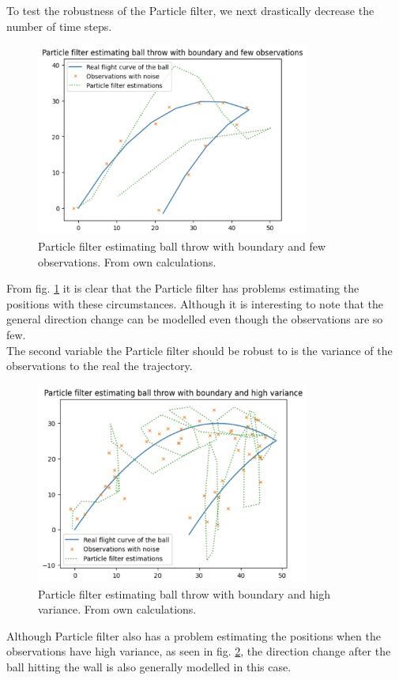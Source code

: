 \documentclass[conference]{IEEEtran}
\begin{document}
To test the robustness of the Particle filter, we next drastically decrease the number of time steps.
\begin{figure}[h]
    \centerline{\includegraphics[width=90mm]{figs/particle-filter-few-observations.png}}
    \caption{Particle filter estimating ball throw with boundary and few observations. From own calculations.}
    \label{fig:particle-filter-few-observations}
\end{figure}
From fig. \ref{fig:particle-filter-few-observations} it is clear that the Particle filter has problems estimating the positions with these circumstances.
Although it is interesting to note that the general direction change can be modelled even though the observations are so few. \\
The second variable the Particle filter should be robust to is the variance of the observations to the real the trajectory.
\begin{figure}[h]
    \centerline{\includegraphics[width=90mm]{figs/particle-filter-high-variance.png}}
    \caption{Particle filter estimating ball throw with boundary and high variance. From own calculations.}
    \label{fig:particle-filter-high-variance}
\end{figure}
Although Particle filter also has a problem estimating the positions when the observations have high variance, as seen in fig. \ref{fig:particle-filter-high-variance}, the direction change after the ball hitting the wall is also generally modelled in this case.
\end{document}
